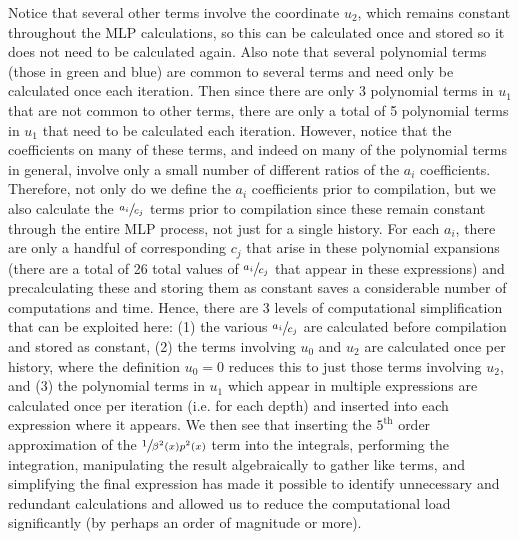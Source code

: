 \documentclass[a4paper,landscape]{article}
\begin{document}
Notice that several other terms involve the coordinate $u_2$, which remains constant throughout the MLP calculations, so this can be calculated once and stored so it does not need to be calculated again. Also note that several polynomial terms (those in green and blue) are common to several terms and need only be calculated once each iteration.  Then since there are only 3 polynomial terms in $u_1$ that are not common to other terms, there are only a total of 5 polynomial terms in $u_1$ that need to be calculated each iteration.  However, notice that the coefficients on many of these terms, and indeed on many of the polynomial terms in general, involve only a small number of different ratios of the $a_i$ coefficients.  Therefore, not only do we define the $a_i$ coefficients prior to compilation, but we also calculate the $\sfrac{a_i}{c_j}$ terms prior to compilation since these remain constant through the entire MLP process, not just for a single history.  For each $a_i$, there are only a handful of corresponding $c_j$ that arise in these polynomial expansions (there are a total of 26 total values of $\sfrac{a_i}{c_j}$ that appear in these expressions) and precalculating these and storing them as constant saves a considerable number of computations and time.  Hence, there are 3 levels of computational simplification that can be exploited here: (1) the various $\sfrac{a_i}{c_j}$ are calculated before compilation and stored as constant, (2) the terms involving $u_0$ and $u_2$ are calculated once per history, where the definition $u_0=0$ reduces this to just those terms involving $u_2$, and (3) the polynomial terms in $u_1$ which appear in multiple expressions are calculated once per iteration (i.e. for each depth) and inserted into each expression where it appears.  We then see that inserting the $5^{\text{th}}$ order approximation of the $\sfrac{1}{\beta^2(x)p^2(x)}$ term into the integrals, performing the integration, manipulating the result algebraically to gather like terms, and simplifying the final expression has made it possible to identify unnecessary and redundant calculations and allowed us to reduce the computational load significantly (by perhaps an order of magnitude or more).
\end{document}
